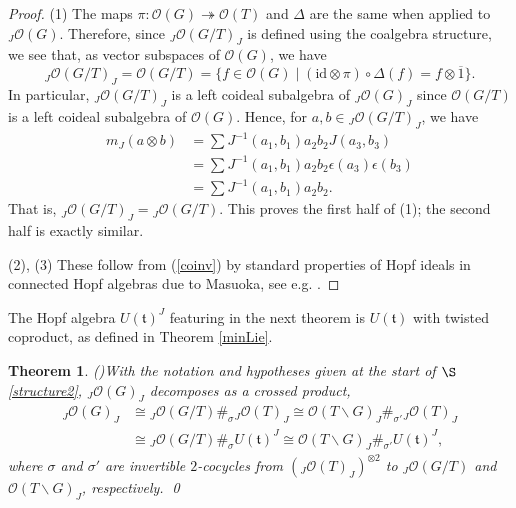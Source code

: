 \documentclass{amsart}
\numberwithin{equation}{section}
\newtheorem{theorem}{Theorem}[section]
\theoremstyle{definition}
\begin{document}
\begin{proof} 
(1) The maps $\pi:\mathcal{O}(G)\twoheadrightarrow \mathcal{O}(T)$ and $\Delta$ are the same when applied to $_J\mathcal{O}(G)$. Therefore, since ${}_J\mathcal{O}(G/T)_J$ is defined using the coalgebra structure, we see that, as vector subspaces of $\mathcal{O}(G)$, we have
\begin{equation}\label{coinv} {}_J\mathcal{O}(G/T)_J = \mathcal{O}(G/T) = \{f \in \mathcal{O}(G)\mid (\mathrm{id} \otimes \pi)\circ \Delta (f) = f \otimes \overline{1}\}.
\end{equation}
In particular, ${}_J\mathcal{O}(G/T)_J$ is a left coideal subalgebra of ${}_J\mathcal{O}(G)_J$ since $\mathcal{O}(G/T)$ is a left coideal subalgebra of $\mathcal{O}(G)$. Hence, for 
$a,b \in {}_J\mathcal{O}(G/T)_J$, we have
\begin{align*} m_J(a \otimes b) &= \sum J^{-1}(a_1,b_1)a_2b_2J(a_3,b_3)\\
 &=  \sum J^{-1}(a_1,b_1)a_2b_2\epsilon(a_3)\epsilon(b_3)\\
&= \sum J^{-1}(a_1,b_1)a_2b_2.
\end{align*}
That is, ${}_J\mathcal{O}(G/T)_J={}_J\mathcal{O}(G/T)$. This proves the first half of (1); the second half is exactly similar.

(2), (3) These follow from (\ref{coinv}) by standard properties of Hopf ideals in connected Hopf algebras due to Masuoka, see e.g. \cite[Proposition 2.3]{BG}.
\end{proof}

The Hopf algebra $U(\mathfrak{t})^J$ featuring in the next theorem is $U(\mathfrak{t})$ with twisted coproduct, as defined in Theorem \ref{minLie}.

\begin{theorem}{\rm (\cite[Theorem 3.8]{G2})}\label{crossed} 
With the notation and hypotheses given at the start of $\S$\ref{structure2}, ${}_J\mathcal{O}(G)_J$ decomposes as a crossed product,
\begin{align*} {}_J\mathcal{O}(G)_J &\cong {}_J\mathcal{O}(G/T)\#_{\sigma} {}_J\mathcal{O}(T)_J\cong \mathcal{O}(T\backslash G)_J \#_{\sigma'} {}_J\mathcal{O}(T)_J\\
&\cong {}_J\mathcal{O}(G/T)\#_{\sigma} U(\mathfrak{t})^J \cong  \mathcal{O}(T\backslash G)_J \#_{\sigma'} U(\mathfrak{t})^J,
\end{align*}
where $\sigma$ and $\sigma'$ are invertible $2$-cocycles from $({}_J\mathcal{O}(T)_J)^{\otimes2}$ to ${}_J\mathcal{O}(G/T)$ and $\mathcal{O}(T\backslash G)_J$, respectively. \qed
\end{theorem}
\end{document}
